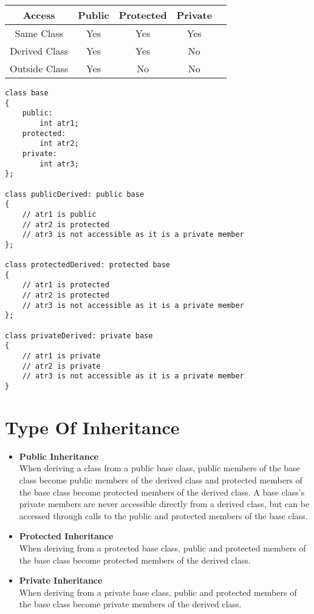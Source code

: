 \documentclass[11pt,fleqn]{book} %
\begin{document}
\begin{center}
\begin{tabular}{ |c|c|c|c|c| } 
\hline
Access & Public & Protected & Private \\
\hline
Same Class & Yes & Yes & Yes \\ 
Derived Class & Yes & Yes & No \\ 
Outside Class & Yes & No & No \\ 
\hline
\end{tabular}
\end{center}
\begin{lstlisting}
class base 
{
	public:
		int atr1;
	protected:
		int atr2;
	private:
		int atr3;
};

class publicDerived: public base
{
	// atr1 is public
	// atr2 is protected
	// atr3 is not accessible as it is a private member
};

class protectedDerived: protected base
{
	// atr1 is protected
	// atr2 is protected
	// atr3 is not accessible as it is a private member
};

class privateDerived: private base
{
	// atr1 is private
	// atr2 is private
	// atr3 is not accessible as it is a private member 
}
\end{lstlisting}

\section{Type Of Inheritance}
\begin{itemize}
\item \textbf{Public Inheritance} \\
	When deriving a class from a public base class, public members of the base class become public members of the derived class and protected members of the base class become protected members of the derived class. A base class's private members are never accessible directly from a derived class, but can be accessed through calls to the public and protected members of the base class.\\
\item \textbf{Protected Inheritance} \\
	When deriving from a protected base class, public and protected members of the base class become protected members of the derived class.\\
\item \textbf{Private Inheritance} \\
	When deriving from a private base class, public and protected members of the base class become private members of the derived class. 
\end{itemize}
\end{document}
